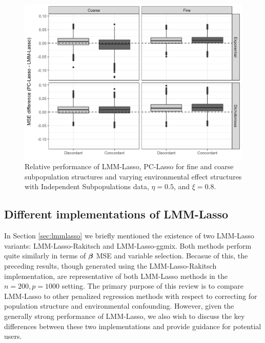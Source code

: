 \begin{figure}[H]
    \centering
    \includegraphics[scale = 0.9]{figures/mse_diff_hetero.png}
    \caption{Relative performance of LMM-Lasso, PC-Lasso for fine and coarse subpopulation structures and varying environmental effect structures with Independent Subpopulations data, $\eta = 0.5$, and $\xi = 0.8$.}
    \label{fig:big_small_gamma}
\end{figure}

\subsection{Different implementations of LMM-Lasso}

In Section \ref{sec:lmmlasso} we briefly mentioned the existence of two LMM-Lasso variants: LMM-Lasso-Rakitsch and LMM-Lasso-ggmix. Both methods perform quite similarly in terms of $\boldsymbol{\beta}{}$ MSE and variable selection. Becasue of this, the preceding results, though generated using the LMM-Lasso-Rakitsch implementation, are representative of both LMM-Lasso methods in the $n = 200, p = 1000$ setting. The primary purpose of this review is to compare LMM-Lasso to other penalized regression methods with respect to correcting for population structure and environmental confounding. However, given the generally strong performance of LMM-Lasso, we also wish to discuss the key differences between these two implementations and provide guidance for potential users.

